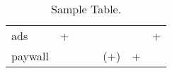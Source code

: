 \begin{table}
\begin{minipage}{\textwidth}
\begin{tabular}{lcccccc@{}}
            ads                                                                                                                                         & +          &            &            &            &            & +          \\
            paywall                                                                                                                                     &            &            &            & (+)        & +          &            \\
            \bottomrule
        \end{tabular}
        \caption{Sample Table.}
        \label{table_summary}
    \end{minipage}
\end{table}
